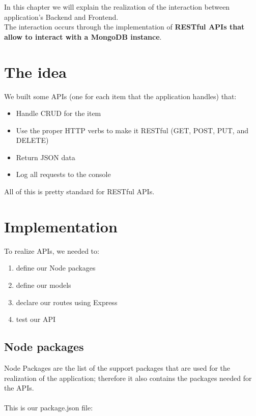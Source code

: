 In this chapter we will explain the realization of the interaction between application's Backend and Frontend.
\\The interaction occurs through the implementation of \textbf{RESTful APIs that allow to interact with a MongoDB instance}.

\section{The idea}

We built some APIs (one for each item that the application handles) that:

\begin{itemize}
	\item Handle CRUD for the item
	\item Use the proper HTTP verbs to make it RESTful (GET, POST, PUT, and DELETE)
	\item Return JSON data
	\item Log all requests to the console
\end{itemize}

All of this is pretty standard for RESTful APIs.

\newpage

\section{Implementation}

To realize APIs, we needed to: 

\begin{enumerate}
	\item define our Node packages
	\item define our models
	\item declare our routes using Express
	\item test our API
\end{enumerate}

\subsection{Node packages}

Node Packages are the list of the support packages that are used for the realization of the application; therefore it also contains the packages needed for the APIs. 
\\
\\This is our package.json file:

